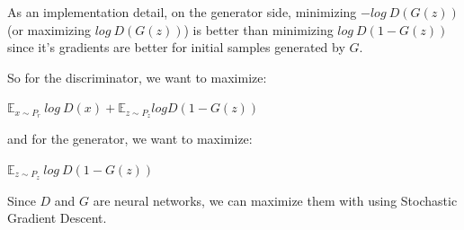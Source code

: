 As an implementation detail, on the generator side, minimizing $-log~D(G(z))$ (or maximizing $log~D(G(z))$) is better than minimizing $log~D(1-G(z))$ since it's gradients are better for initial samples generated by $G$.

So for the discriminator, we want to maximize:

\begin{center}
	$\mathbb{E}_{x \sim P_r}~log~D(x) + \mathbb{E}_{z \sim P_z} log D(1-G(z))$
\end{center}

and for the generator, we want to maximize:

\begin{center}
	$\mathbb{E}_{z \sim P_z}~log~D(1-G(z))$
\end{center}

Since $D$ and $G$ are neural networks, we can maximize them with using Stochastic Gradient Descent. 
